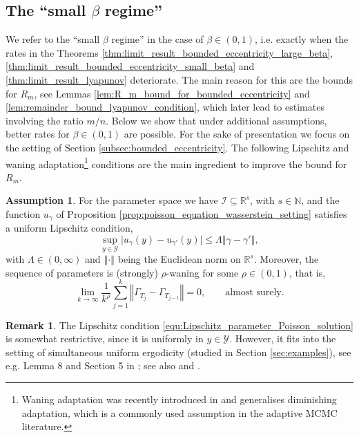 \documentclass[12pt]{article}
\theoremstyle{definition}
\newtheorem{rem}[thm]{Remark}
\newtheorem{ass}[thm]{Assumption}
\newcommand{\norm}[1]{\left\Vert #1 \right\Vert}
\newcommand{\N}{\mathbb{N}}
\newcommand{\R}{\mathbb{R}}
\newcommand{\cY}{\mathcal{Y}}
\begin{document}
	\subsection{The ``small $\beta$ regime''}\label{subsec:small_beta_regime}
We refer to the ``small $\beta$ regime'' in the case of $\beta\in(0,1)$, i.e. exactly when the rates in the Theorems \ref{thm:limit_result_bounded_eccentricity_large_beta}, \ref{thm:limit_result_bounded_eccentricity_small_beta} and \ref{thm:limit_result_lyapunov} deteriorate.
	The main reason for this are the bounds for $R_m$, see Lemmas \ref{lem:R_m_bound_for_bounded_eccentricity} and \ref{lem:remainder_bound_lyapunov_condition}, which later lead to estimates involving the ratio $m/n$. 
	Below we show that under additional assumptions, better rates for $\beta\in (0,1)$ are possible. 
	For the sake of presentation we focus on the setting of Section \ref{subsec:bounded_eccentricity}. 
	The following Lipschitz and waning adaptation\footnote{{Waning adaptation was recently introduced in \cite{laitinen2024invitationadaptivemarkovchain} and generalises diminishing adaptation, which is a commonly used assumption in the adaptive MCMC literature.}} conditions are the main ingredient to improve the bound for $R_m$. 
	\begin{ass}\label{ass:wanig_adaptation_and_Lipschitz}
		For the parameter space we have $\mathcal{I}\subseteq \R^s$, with $s \in \N$, and the function $u_\gamma$ of Proposition \ref{prop:poisson_equation_wasserstein_setting} satisfies a uniform Lipschitz condition,
		\begin{equation}\label{equ:Lipschitz_parameter_Poisson_solution}
			\sup_{y \in \cY}\vert u_\gamma(y) - u_{\gamma'}(y) \vert \leq \Lambda \norm{\gamma- \gamma'},
		\end{equation}
		with $\Lambda \in (0, \infty)$ and $\norm{\cdot}$ being the Euclidean norm on $\R^s$. 
		Moreover, the sequence of parameters is (strongly) $\rho$-waning for some $\rho \in (0,1)$, that is, 
		\begin{equation}\label{equ:waning_adaptation}
			\lim_{k\to \infty} \frac{1}{k^\rho} \sum_{j=1}^k \norm{\Gamma_{T_j}-\Gamma_{T_{j-1}}} =0, \qquad \text{almost surely}.
		\end{equation}
	\end{ass}
	
	\begin{rem}
		The Lipschitz condition \eqref{equ:Lipschitz_parameter_Poisson_solution} is somewhat restrictive, since it is uniformly in $y \in \cY$. 
		However, it fits into the setting of simultaneous uniform ergodicity (studied in Section \ref{sec:examples}), see e.g. Lemma 8 and Section 5 in \cite{laitinen2024invitationadaptivemarkovchain}; see also \cite[Proposition 3]{andrieu2006ergodicity} and \cite[Proposition 4]{saksman2010ergodicity}.
	\end{rem}
	
\end{document}
